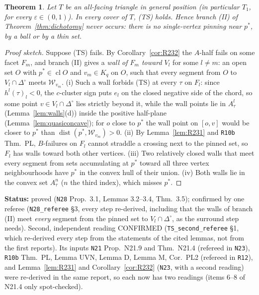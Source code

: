 \documentclass[11pt]{article}
\newtheorem{theorem}{Theorem}[section]
\theoremstyle{definition}
\theoremstyle{remark}
\newcommand{\Di}{\Delta^{\circ}}
\newcommand{\cl}{\operatorname{cl}}
\newcommand{\src}[1]{\texttt{#1}}
\newcommand{\status}[1]{\par\smallskip\noindent\textbf{Status:} #1\par\smallskip}
\begin{document}
\begin{theorem}\label{thm:TSalways}
Let $T$ be an all-facing triangle in general position (in particular $T_1$, for every $\varepsilon\in(0,1)$). In every cover of $T$, (TS) holds. Hence branch (II) of Theorem~\ref{thm:dichotomy} never occurs: there is no single-vertex pinning near $p^*$, by a ball or by a thin set.
\end{theorem}
\begin{proof}[Proof sketch]
Suppose (TS) fails. By Corollary~\ref{cor:R232} the $A$-half fails on some facet $F_m$, and branch (II) gives a \emph{wall of $F_m$ toward $V_l$} for some $l\ne m$: an open set $O$ with $p^*\in\cl O$ and $v_m\in K_q$ on $O$, such that every segment from $O$ to $V_l\cap\Di$ meets $\mathcal W_{v_m}$. (i) Such a wall forbids (TS) at every $\tau$ on $F_l$: since $h^l(\tau)_l<0$, the $c$-cluster sign puts $e_l$ on the closed negative side of the chord, so some point $v\in V_l\cap\Di$ lies strictly beyond it, while the wall points lie in $A^l_\tau$ (Lemma~\ref{lem:walls}(d)) inside the positive half-plane (Lemma~\ref{lem:quasiconcave}); for $o$ close to $p^*$ the wall point on $[o,v]$ would be closer to $p^*$ than $\operatorname{dist}(p^*,\mathcal W_{v_m})>0$. (ii) By Lemma~\ref{lem:R231} and \src{R10b} Thm.~PL, $B$-failures on $F_l$ cannot straddle a crossing next to the pinned set, so $F_l$ has walls toward both other vertices. (iii) Two relatively closed walls that meet every segment from sets accumulating at $p^*$ toward all three vertex neighbourhoods have $p^*$ in the convex hull of their union. (iv) Both walls lie in the convex set $A^n_\tau$ ($n$ the third index), which misses $p^*$.
\end{proof}
\status{proved (\src{N28} Prop.~3.1, Lemmas 3.2--3.4, Thm.~3.5); confirmed by one referee (\src{N28\_referee} \S3, every step re-derived, including that the walls of branch (II) meet \emph{every} segment from the pinned set to $V_l\cap\Di$, as the surround step needs). Second, independent reading CONFIRMED (\src{TS\_second\_referee} \S1, which re-derived every step from the statements of the cited lemmas, not from the first reports). Its inputs \src{N21} Prop.~N21.9 and Thm.~N21.4 (refereed in \src{N23}), \src{R10b} Thm.~PL, Lemma UVN, Lemma D, Lemma M, Cor.~PL2 (refereed in \src{R12}), and Lemma~\ref{lem:R231} and Corollary~\ref{cor:R232} (\src{N23}, with a second reading) were re-derived in the same report, so each now has two readings (items 6--8 of N21.4 only spot-checked).}
\end{document}
